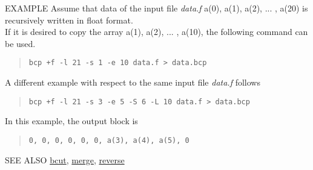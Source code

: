 \begin{qsection}{EXAMPLE}
Assume that data of the input file {\em data.f}
{a(0), a(1), a(2), ... , a(20)} is recursively written in float format.\\
If it is desired to copy the array {a(1), a(2), ... , a(10)}, 
the following command can be used.
\begin{quote}
\verb!bcp +f -l 21 -s 1 -e 10 data.f > data.bcp!
\end{quote}

\par
A different example with respect to the same input file {\em data.f}
follows

\begin{quote}
\verb!bcp +f -l 21 -s 3 -e 5 -S 6 -L 10 data.f > data.bcp!
\end{quote}

In this example, the output block is
\begin{quote}
\verb!0, 0, 0, 0, 0, 0, a(3), a(4), a(5), 0!
\end{quote}
\end{qsection}

\begin{qsection}{SEE ALSO}
\hyperlink{bcut}{bcut},
\hyperlink{merge}{merge},
\hyperlink{reverse}{reverse}
\end{qsection}
